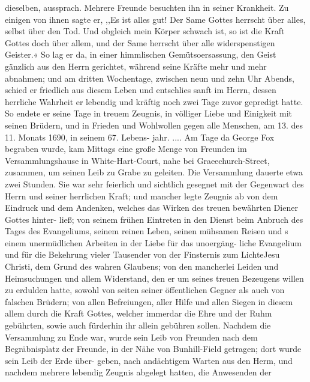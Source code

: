 dieselben, aussprach. Mehrere Freunde besuchten ihn in seiner
Krankheit. Zu einigen von ihnen sagte er, ,,Es ist alles gut! Der
Same Gottes herrscht über alles, selbst über den Tod. Und obgleich
mein Körper schwach ist, so ist die Kraft Gottes doch über allem,
und der Same herrscht über alle widerspenstigen Geister.«
So lag er da, in einer himmlischen Gemütsoersassung, den
Geist gänzlich aus den Herrn gerichtet, während seine Kräfte mehr
und mehr abnahmen; und am dritten Wochentage, zwischen neun
und zehn Uhr Abends, schied er friedlich aus diesem Leben und
entschlies sanft im Herrn, dessen herrliche Wahrheit er lebendig
und kräftig noch zwei Tage zuvor gepredigt hatte. So endete
er seine Tage in treuem Zeugnis, in völliger Liebe und Einigkeit
mit seinen Brüdern, und in Frieden und Wohlwollen gegen alle
Menschen, am 13. des 11. Monats 1690, in seinem 67. Lebens-
jahr. ....
Am Tage da George Fox begraben wurde, kam Mittags
eine große Menge von Freunden im Versammlungshause in
White-Hart-Court, nahe bei Graeechurch-Street, zusammen, um
seinen Leib zu Grabe zu geleiten. Die Versammlung dauerte
etwa zwei Stunden. Sie war sehr feierlich und sichtlich gesegnet
mit der Gegenwart des Herrn und seiner herrlichen Kraft; und
mancher legte Zeugnis ab von dem Eindruck und dem Andenken,
welches das Wirken des treuen bewährten Diener Gottes hinter-
ließ; von seinem frühen Eintreten in den Dienst beim Anbruch des
Tages des Evangeliums, seinem reinen Leben, seinen mühsamen Reisen
und s einem unermüdlichen Arbeiten in der Liebe für das unoergäng-
liche Evangelium und für die Bekehrung vieler Tausender von der
Finsternis zum LichteJesu Christi, dem Grund des wahren Glaubens;
von den mancherlei Leiden und Heimsuchungen und allem Widerstand,
den er um seines treuen Bezeugens willen zu erdulden hatte, sowohl
von seiten seiner öffentlichen Gegner als auch von falschen Brüdern;
von allen Befreiungen, aller Hilfe und allen Siegen in diesem
allem durch die Kraft Gottes, welcher immerdar die Ehre und
der Ruhm gebührten, sowie auch fürderhin ihr allein gebühren sollen.
Nachdem die Versammlung zu Ende war, wurde sein Leib
von Freunden nach dem Begräbnisplatz der Freunde, in der Nähe
von Bunhill-Field getragen; dort wurde sein Leib der Erde über-
geben, nach andächtigem Warten aus den Herm, und nachdem
mehrere lebendig Zeugnis abgelegt hatten, die Anwesenden der


